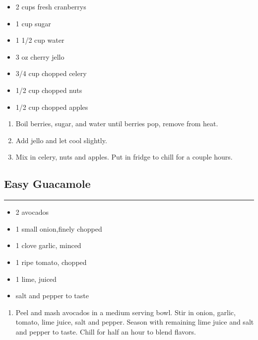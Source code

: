 \documentclass{article}
\begin{document}
\begin{framed}
    \begin{itemize}
        \item 2 cups fresh cranberrys
        \item 1 cup sugar
        \item 1 1/2 cup water
        \item 3 oz cherry jello 
        \item 3/4 cup chopped celery 
        \item 1/2 cup chopped nuts 
        \item 1/2 cup chopped apples
    \end{itemize}
\end{framed}

\begin{enumerate}
    \item 
        Boil berries, sugar, and water until berries pop, remove from heat.
    \item 
        Add jello and let cool slightly.
    \item 
        Mix in celery, nuts and apples. Put in fridge to chill for a couple hours.
\end{enumerate}
\newpage

\subsection{Easy Guacamole} 
\noindent\rule[0.5ex]{\linewidth}{1pt}

\begin{framed}
    \begin{itemize}
        \item 2 avocados
        \item 1 small onion,finely chopped
        \item 1 clove garlic, minced
        \item 1 ripe tomato, chopped
        \item 1 lime, juiced
        \item salt and pepper to taste
    \end{itemize}
\end{framed}

\begin{enumerate}
    \item 
        Peel and mash avocados in a medium serving bowl. Stir in onion, garlic, tomato, lime juice, salt and pepper. Season with remaining lime juice and salt and pepper to taste. Chill for half an hour to blend flavors.
\end{enumerate}
\newpage
\end{document}
